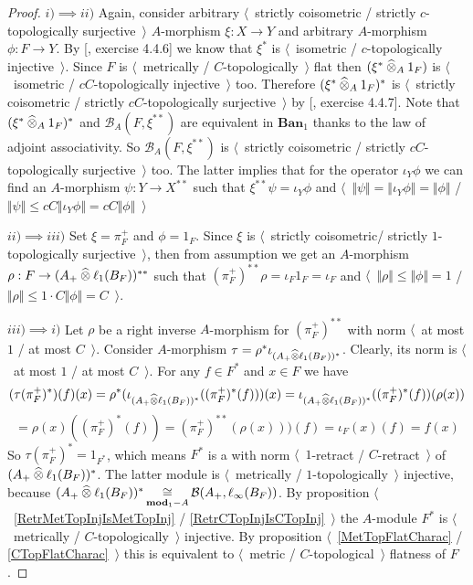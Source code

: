 \begin{proof} $i)\implies ii)$ Again, consider arbitrary $\langle$~strictly coisometric / strictly $c$-topologically surjective~$\rangle$ $A$-morphism $\xi:X\to Y$ and arbitrary $A$-morphism $\phi:F\to Y$. By [\cite{HelLectAndExOnFuncAn}, exercise 4.4.6] we know that $\xi^*$ is $\langle$~isometric / $c$-topologically injective~$\rangle$. Since $F$ is $\langle$~metrically / $C$-topologically~$\rangle$ flat then $(\xi^*\mathbin{\widehat{\otimes}}_{A}1_F)$ is $\langle$~isometric / $cC$-topologically injective~$\rangle$ too. Therefore $(\xi^*\mathbin{\widehat{\otimes}}_{A}1_F)^*$ is $\langle$~strictly coisometric / strictly $cC$-topologically surjective~$\rangle$ by [\cite{HelLectAndExOnFuncAn}, exercise 4.4.7]. Note that $(\xi^*\mathbin{\widehat{\otimes}}_{A}1_F)^*$ and $\mathcal{B}_A(F,\xi^{**})$ are equivalent in $\mathbf{Ban}_1$ thanks to the law of adjoint associativity. So $\mathcal{B}_A(F,\xi^{**})$ is $\langle$~strictly coisometric / strictly $cC$-topologically surjective~$\rangle$ too. The latter implies that for the operator $\iota_Y\phi$ we can find an $A$-morphism $\psi:Y\to X^{**}$ such that $\xi^{**}\psi=\iota_Y\phi$ and  $\langle$~$\Vert\psi\Vert=\Vert\iota_Y\phi\Vert=\Vert\phi\Vert$ / $\Vert\psi\Vert\leq cC\Vert\iota_Y\phi\Vert=cC\Vert\phi\Vert$~$\rangle$

$ii)\implies iii)$ Set $\xi=\pi_F^+$ and $\phi=1_F$. Since $\xi$ is $\langle$~strictly coisometric/ strictly $1$-topologically surjective~$\rangle$, then from assumption we get an $A$-morphism $\rho:F\to (A_+\mathbin{\widehat{\otimes}}\ell_1(B_F))^{**}$ such that $(\pi_F^+)^{**}\rho=\iota_F 1_F=\iota_F$ and $\langle$~$\Vert\rho\Vert\leq \Vert\phi\Vert=1$ / $\Vert\rho\Vert\leq 1\cdot C\Vert\phi\Vert=C$~$\rangle$.

$iii)\implies i)$ Let $\rho$ be a right inverse $A$-morphism for $(\pi_F^+)^{**}$ with norm $\langle$~at most $1$ / at most $C$~$\rangle$. Consider $A$-morphism $\tau=\rho^*\iota_{(A_+\mathbin{\widehat{\otimes}}\ell_1(B_F))^*}$. Clearly, its norm is $\langle$~at most $1$ / at most $C$~$\rangle$. For any $f\in F^*$ and $x\in F$ we have
$$
(\tau(\pi_F^+)^*)(f)(x)
=\rho^*(\iota_{(A_+\mathbin{\widehat{\otimes}}\ell_1(B_F))^*}((\pi_F^+)^*(f)))(x)
=\iota_{(A_+\mathbin{\widehat{\otimes}}\ell_1(B_F))^*}((\pi_F^+)^*(f))(\rho(x))
$$
$$
=\rho(x)((\pi_F^+)^*(f))
=(\pi_F^+)^{**}(\rho(x)))(f)
=\iota_F(x)(f)
=f(x)
$$
So $\tau(\pi_F^+)^*=1_{F^*}$, which means $F^*$ is a with norm $\langle$~$1$-retract / $C$-retract~$\rangle$ of $(A_+\mathbin{\widehat{\otimes}}\ell_1(B_F))^*$. The latter module is $\langle$~metrically / $1$-topologically~$\rangle$ injective, because $(A_+\mathbin{\widehat{\otimes}}\ell_1(B_F))^*\mathop{\mathbin{\cong}}\limits_{\mathbf{mod}_1-A}\mathcal{B}(A_+,\ell_\infty(B_F))$. By proposition $\langle$~\ref{RetrMetTopInjIsMetTopInj} / \ref{RetrCTopInjIsCTopInj}~$\rangle$ the $A$-module $F^*$ is $\langle$~metrically / $C$-topologically~$\rangle$ injective. By proposition $\langle$~\ref{MetTopFlatCharac} / \ref{CTopFlatCharac}~$\rangle$ this is equivalent to $\langle$~metric / $C$-topological~$\rangle$ flatness of $F$.
\end{proof}


